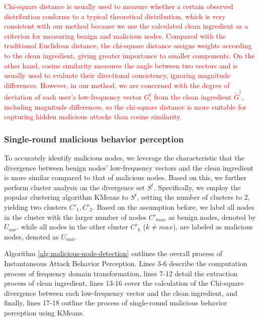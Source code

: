 \documentclass[lettersize,journal]{IEEEtran}
\begin{document}
\textcolor{red}{
Chi-square distance is usually used to measure whether a certain observed distribution conforms to a typical theoretical distribution, which is very consistent with our method because we use the calculated clean ingredient as a criterion for measuring benign and malicious nodes. Compared with the traditional Euclidean distance, the chi-square distance assigns weights according to the clean ingredient, giving greater importance to smaller components. On the other hand, cosine similarity measures the angle between two vectors and is usually used to evaluate their directional consistency, ignoring magnitude differences. However, in our method, we are concerned with the degree of deviation of each user's low-frequency vector $G_i^t$ from the clean ingredient $\tilde{G}^t$, including magnitude differences, so the chi-square distance is more suitable for capturing hidden malicious attacks than cosine similarity.
}

\subsubsection{Single-round malicious behavior perception}
To accurately identify malicious nodes, we leverage the characteristic that the divergence between benign nodes' low-frequency vectors and the clean ingredient is more similar compared to that of malicious nodes. Based on this, we further perform cluster analysis on the divergence set \(S^t\). Specifically, we employ the popular clustering algorithm KMeans \cite{wan2023four} to \(S^t\), setting the number of clusters to 2, yielding two clusters \(C'_1, C'_2\). Based on the assumption before,  we label all nodes in the cluster with the larger number of nodes \(C'_{max}\) as benign nodes, denoted by \(U_{nor}\). while all nodes in the other cluster \(C'_k\) (\(k \neq {max}\)), are labeled as malicious nodes, denoted as \(U_{mal}\).

Algorithm \ref{alg:malicious-node-detection} outlines the overall process of Instantaneous Attack Behavior Perception. 
Lines 3-6 describe the computation process of frequency domain transformation, lines 7-12 detail the extraction process of clean ingredient, lines 13-16 cover the calculation of the Chi-square divergence between each low-frequency vector and the clean ingredient, and finally, lines 17-18 outline the process of single-round malicious behavior perception using KMeans.
\end{document}
